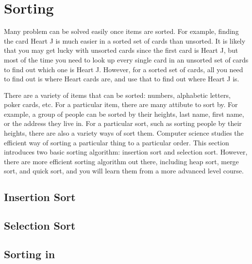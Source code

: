 \documentclass[../main.tex]{subfiles}
\begin{document}
    \section{Sorting}
    Many problem can be solved easily once items are sorted. For example, finding
    the card Heart J is much easier in a sorted set of cards than unsorted. It is
    likely that you may get lucky with unsorted cards since the first card is
    Heart J, but most of the time you need to look up every single card in an
    unsorted set of cards to find out which one is Heart J. However, for a sorted
    set of cards, all you need to find out is where Heart cards are, and use that
    to find out where Heart J is.

    There are a variety of items that can be sorted: numbers, alphabetic letters,
    poker cards, etc. For a particular item, there are many attibute to sort by.
    For example, a group of people can be sorted by their heights, last name,
    first name, or the address they live in. For a particular sort, such as sorting
    people by their heights, there are also a variety ways of sort them. Computer
    science studies the efficient way of sorting a particular thing to a particular
    order. This section introduces two basic sorting algorithm: insertion sort
    and selection sort. However, there are more efficient sorting algorithm out
    there, including heap sort, merge sort, and quick sort, and you will learn
    them from a more advanced level course.

    \subsection{Insertion Sort}

    \subsection{Selection Sort}

    \subsection{Sorting in \csharp}
    
\end{document}
